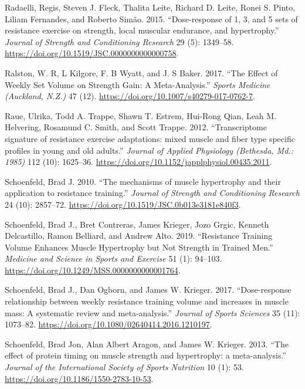 \documentclass[
  letterpaper,
  DIV=11,
  numbers=noendperiod]{scrreprt}
\newlength{\cslhangindent}
\newlength{\cslentryspacingunit} %
\newenvironment{CSLReferences}[2] %
 {%
  \setlength{\parindent}{0pt}
  \ifodd #1
  \let\oldpar\par
  \def\par{\hangindent=\cslhangindent\oldpar}
  \fi
  \setlength{\parskip}{#2\cslentryspacingunit}
 }%
 {}
\begin{document}
\begin{CSLReferences}{1}{0}
\leavevmode{}%
Radaelli, Regis, Steven J. Fleck, Thalita Leite, Richard D. Leite, Ronei
S. Pinto, Liliam Fernandes, and Roberto Simão. 2015. {``Dose-response of
1, 3, and 5 sets of resistance exercise on strength, local muscular
endurance, and hypertrophy.''} \emph{Journal of Strength and
Conditioning Research} 29 (5): 1349--58.
\url{https://doi.org/10.1519/JSC.0000000000000758}.

\leavevmode{}%
Ralston, W. R, L Kilgore, F. B Wyatt, and J. S Baker. 2017. {``The
Effect of Weekly Set Volume on Strength Gain: A Meta-Analysis.''}
\emph{Sports Medicine (Auckland, N.Z.)} 47 (12).
\url{https://doi.org/10.1007/s40279-017-0762-7}.

\leavevmode{}%
Raue, Ulrika, Todd A. Trappe, Shawn T. Estrem, Hui-Rong Qian, Leah M.
Helvering, Rosamund C. Smith, and Scott Trappe. 2012. {``Transcriptome
signature of resistance exercise adaptations: mixed muscle and fiber
type specific profiles in young and old adults.''} \emph{Journal of
Applied Physiology (Bethesda, Md.: 1985)} 112 (10): 1625--36.
\url{https://doi.org/10.1152/japplphysiol.00435.2011}.

\leavevmode{}%
Schoenfeld, Brad J. 2010. {``The mechanisms of muscle hypertrophy and
their application to resistance training.''} \emph{Journal of Strength
and Conditioning Research} 24 (10): 2857--72.
\url{https://doi.org/10.1519/JSC.0b013e3181e840f3}.

\leavevmode{}%
Schoenfeld, Brad J., Bret Contreras, James Krieger, Jozo Grgic, Kenneth
Delcastillo, Ramon Belliard, and Andrew Alto. 2019. {``Resistance
Training Volume Enhances Muscle Hypertrophy but Not Strength in Trained
Men.''} \emph{Medicine and Science in Sports and Exercise} 51 (1):
94--103. \url{https://doi.org/10.1249/MSS.0000000000001764}.

\leavevmode{}%
Schoenfeld, Brad J., Dan Ogborn, and James W. Krieger. 2017.
{``Dose-response relationship between weekly resistance training volume
and increases in muscle mass: A systematic review and meta-analysis.''}
\emph{Journal of Sports Sciences} 35 (11): 1073--82.
\url{https://doi.org/10.1080/02640414.2016.1210197}.

\leavevmode{}%
Schoenfeld, Brad Jon, Alan Albert Aragon, and James W. Krieger. 2013.
{``The effect of protein timing on muscle strength and hypertrophy: a
meta-analysis.''} \emph{Journal of the International Society of Sports
Nutrition} 10 (1): 53. \url{https://doi.org/10.1186/1550-2783-10-53}.


\end{CSLReferences}
\end{document}
